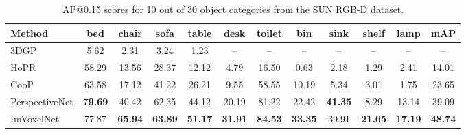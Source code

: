\documentclass[10pt,twocolumn,letterpaper]{article}
\begin{document}
\begin{table*}[!ht]
    \centering \small
    \begingroup \setlength{\tabcolsep}{2pt}
    \begin{tabular}{l|cccccccccc|c}
    \hline
    Method & bed & chair & sofa & table & desk & toilet & bin & sink & shelf & lamp & mAP \\ \hline
    3DGP\cite{choi20133dgp} & \phantom{0}5.62 & \phantom{0}2.31 & \phantom{0}3.24 & \phantom{0}1.23 & -- & -- & -- & -- & -- & -- & -- \\
    HoPR\cite{huang2018holistic} & 58.29 & 13.56 & 28.37 & 12.12 & \phantom{0}4.79 & 16.50 & \phantom{0}0.63 & \phantom{0}2.18 & \phantom{0}1.29 & \phantom{0}2.41 & 14.01 \\
    CooP\cite{huang2018cooperative} & 63.58 & 17.12 & 41.22 & 26.21 & \phantom{0}9.55 & 58.55 & 10.19 & \phantom{0}5.34 & \phantom{0}3.01 & \phantom{0}1.75 & 23.65 \\
    PerspectiveNet\cite{huang2019perspectivenet} & \textbf{79.69} & 40.42 & 62.35 & 44.12 & 20.19 & 81.22 & 22.42 & \textbf{41.35} & 8.29 & 13.14 & 39.09 \\
    ImVoxelNet & 77.87 & \textbf{65.94} & \textbf{63.89} & \textbf{51.17} & \textbf{31.91} & \textbf{84.53} & \textbf{33.35} & 39.91 & \textbf{21.65} & \textbf{17.19} & \textbf{48.74} \\ \hline
    \end{tabular} \endgroup
    \caption{AP@0.15 scores for 10 out of 30 object categories \cite{huang2019perspectivenet} from the SUN RGB-D dataset.}
    \label{tab:sunrgbd_perspective_10}
\end{table*}
\end{document}
